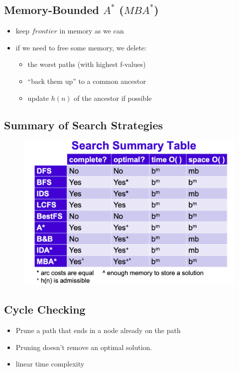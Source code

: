 \documentclass{article}
\begin{document}
\subsection{Memory-Bounded $A^{*}$ ($MBA^{*}$)}

\begin{itemize}
    \item keep $frontier$ in memory as we can
    \item if we need to free some memory, we delete:
        \begin{itemize}
            \item the worst paths (with highest f-values)
            \item ``back them up'' to a common ancestor
            \item update $h(n)$ of the ancestor if possible
        \end{itemize}
\end{itemize}

\subsection{Summary of Search Strategies}

\begin{figure}[H]
    \includegraphics[width=\textwidth]{summary_of_search_strategies}
    \centering
\end{figure}

\subsection{Cycle Checking}

\begin{itemize}
    \item Prune a path that ends in a node already on the path
    \item Pruning doesn't remove an optimal solution.
    \item linear time complexity
\end{itemize}
\end{document}
